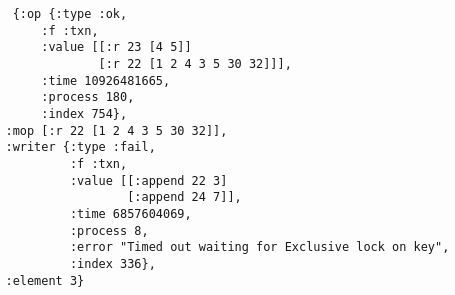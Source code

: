 \begin{lstlisting}
    {:op {:type :ok,
        :f :txn,
        :value [[:r 23 [4 5]]
                [:r 22 [1 2 4 3 5 30 32]]],
        :time 10926481665,
        :process 180,
        :index 754},
   :mop [:r 22 [1 2 4 3 5 30 32]],
   :writer {:type :fail,
            :f :txn,
            :value [[:append 22 3]
                    [:append 24 7]],
            :time 6857604069,
            :process 8,
            :error "Timed out waiting for Exclusive lock on key",
            :index 336},
   :element 3}
\end{lstlisting}